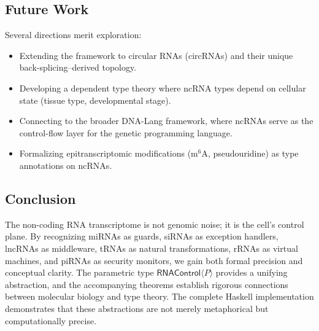 \documentclass[12pt,a4paper]{article}
\theoremstyle{definition}
\newcommand{\RNAType}{\mathsf{RNAControl}}
\begin{document}
\subsection{Future Work}

Several directions merit exploration:
\begin{itemize}
  \item Extending the framework to circular RNAs (circRNAs) and their
    unique back-splicing--derived topology.
  \item Developing a dependent type theory where ncRNA types depend on
    cellular state (tissue type, developmental stage).
  \item Connecting to the broader DNA-Lang framework, where ncRNAs serve
    as the control-flow layer for the genetic programming language.
  \item Formalizing epitranscriptomic modifications (m$^6$A, pseudouridine)
    as type annotations on ncRNAs.
\end{itemize}

\subsection{Conclusion}

The non-coding RNA transcriptome is not genomic noise; it is the
cell's control plane.  By recognizing miRNAs as guards, siRNAs as
exception handlers, lncRNAs as middleware, tRNAs as natural
transformations, rRNAs as virtual machines, and piRNAs as security
monitors, we gain both formal precision and conceptual clarity.  The
parametric type $\RNAType\langle P\rangle$ provides a unifying
abstraction, and the accompanying theorems establish rigorous
connections between molecular biology and type theory.  The complete
Haskell implementation demonstrates that these abstractions are not
merely metaphorical but computationally precise.
\end{document}
